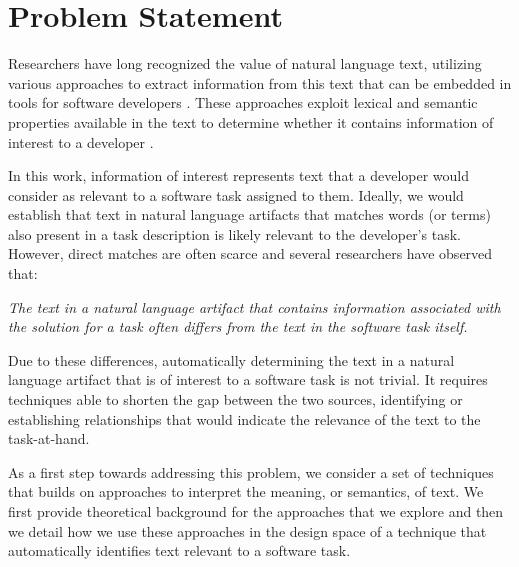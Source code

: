 
\section{Problem Statement}
\label{cp5:motivation}





Researchers have long recognized the value of natural language
text, utilizing various approaches to extract
information from this text that can be embedded in
tools for software developers .
These approaches exploit lexical and semantic properties available in the text to determine 
whether it contains information of interest to a developer . 


In this work, information of interest represents text that a developer would consider as relevant to a software task assigned to them. Ideally, we would establish that text in natural language artifacts that matches  
words (or terms) also present in a task description is likely relevant to the developer's task.
 However, direct matches are often scarce  and several researchers have observed that:



\medskip
\begin{bluequote}
    \textit{The text in a natural language artifact that contains information associated with the solution for a task often differs from the text in the software task itself.}
\end{bluequote}



Due to these differences, automatically determining the text in a natural language artifact that is of interest to a software task is not trivial. 
It requires techniques able to shorten the gap between the two sources, identifying or establishing relationships that would indicate the relevance of the text to the task-at-hand.


As a first step towards addressing this problem, we consider a set of techniques
 that builds on approaches to interpret the meaning, or semantics, of text.
We first provide theoretical background for the approaches that we explore and then we detail how we use these approaches in the design space of a technique that automatically identifies text relevant to a software task.






